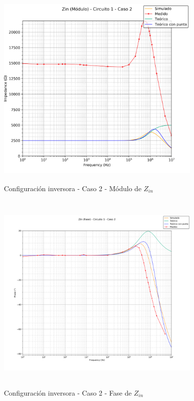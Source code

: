 \begin{figure}[H] %
	\centering
	\includegraphics[width=10cm,height=10cm,keepaspectratio]{../EJ1/00GRAFICOS/c1c2/c1c2ZINpunta.png}
	\caption{Configuración inversora - Caso 2 - M\'odulo de $Z_{in}$}
	\label{c1c2zinM}
\end{figure}

\begin{figure}[H] %
	\centering
	\includegraphics[width=10cm,height=10cm,keepaspectratio]{../EJ1/00GRAFICOS/c1c2/c1c2zinFASE.png}
	\caption{Configuración inversora - Caso 2 - Fase de $Z_{in}$}
	\label{c1c2zinP}
\end{figure}

